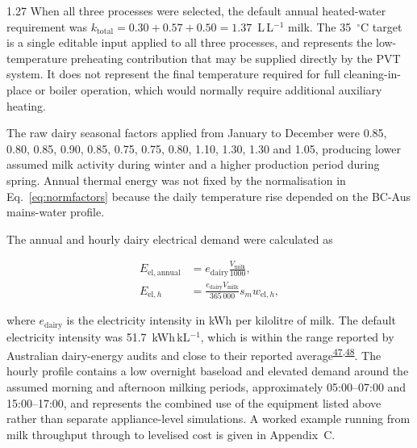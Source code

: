 \documentclass[12pt,letterpaper]{article}
\DeclareRobustCommand{\citenum}[1]{\hyperlink{ref:#1}{#1}} %
\begin{document}
\begin{spacing}{1.27}
When all three processes were selected, the default annual heated-water requirement was $k_{\mathrm{total}}=0.30+0.57+0.50=1.37$~L\,L$^{-1}$ milk. The 35~$^\circ$C target is a single editable input applied to all three processes, and represents the low-temperature preheating contribution that may be supplied directly by the PVT system. It does not represent the final temperature required for full cleaning-in-place or boiler operation, which would normally require additional auxiliary heating.\par

\vspace{0.15in}

The raw dairy seasonal factors applied from January to December were 0.85, 0.80, 0.85, 0.90, 0.85, 0.75, 0.75, 0.80, 1.10, 1.30, 1.30 and 1.05, producing lower assumed milk activity during winter and a higher production period during spring. Annual thermal energy was not fixed by the normalisation in Eq.~\ref{eq:normfactors} because the daily temperature rise depended on the BC-Aus mains-water profile.\par

\vspace{0.15in}

The annual and hourly dairy electrical demand were calculated as

\begin{align}
E_{\mathrm{el,annual}} &= e_{\mathrm{dairy}}\frac{V_{\mathrm{milk}}}{1000}, \label{eq:eldairyannual}\\
E_{\mathrm{el},h} &= \frac{e_{\mathrm{dairy}}V_{\mathrm{milk}}}{365\,000}s_m w_{\mathrm{el},h}, \label{eq:eldairyh}
\end{align}

\noindent where $e_{\mathrm{dairy}}$ is the electricity intensity in kWh per kilolitre of milk. The default electricity intensity was 51.7~kWh\,kL$^{-1}$, which is within the range reported by Australian dairy-energy audits and close to their reported average\textsuperscript{\citenum{47},\citenum{48}}. The hourly profile contains a low overnight baseload and elevated demand around the assumed morning and afternoon milking periods, approximately 05:00--07:00 and 15:00--17:00, and represents the combined use of the equipment listed above rather than separate appliance-level simulations. A worked example running from milk throughput through to levelised cost is given in Appendix~C.\par


\end{spacing}
\end{document}
